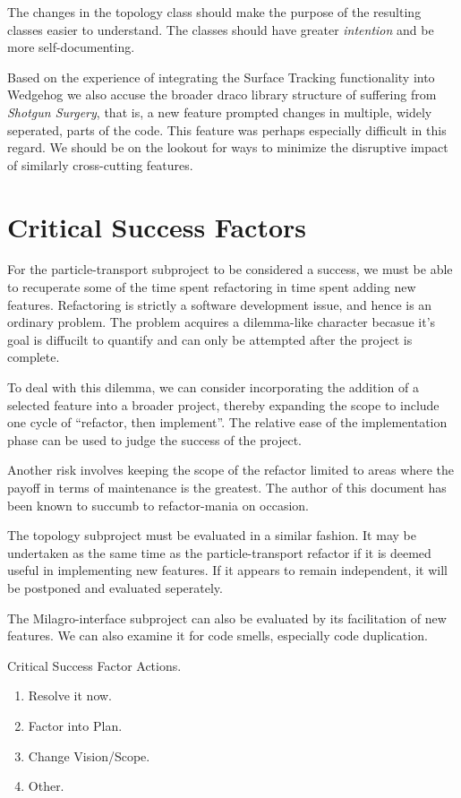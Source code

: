 \documentclass[11pt]{nmemo}
\begin{document}
The changes in the topology class should make the purpose of the
resulting classes easier to understand. The classes should have
greater {\em intention} and be more self-documenting.

Based on the experience of integrating the Surface Tracking
functionality into Wedgehog we also accuse the broader draco library
structure of suffering from {\em Shotgun Surgery}, that is, a new
feature prompted changes in multiple, widely seperated, parts of the
code. This feature was perhaps especially difficult in this regard. We
should be on the lookout for ways to minimize the disruptive impact of
similarly cross-cutting features.

\newpage
\section*{Critical Success Factors}

For the particle-transport subproject to be considered a success, we
must be able to recuperate some of the time spent refactoring in time
spent adding new features. Refactoring is strictly a software
development issue, and hence is an ordinary problem. The problem
acquires a dilemma-like character becasue it's goal is diffucilt to
quantify and can only be attempted after the project is complete.

To deal with this dilemma, we can consider incorporating the addition
of a selected feature into a broader project, thereby expanding the
scope to include one cycle of ``refactor, then implement''. The
relative ease of the implementation phase can be used to judge the
success of the project.

Another risk involves keeping the scope of the refactor limited to
areas where the payoff in terms of maintenance is the greatest. The
author of this document has been known to succumb to refactor-mania on
occasion. 

The topology subproject must be evaluated in a similar fashion. It may
be undertaken as the same time as the particle-transport refactor if
it is deemed useful in implementing new features. If it appears to
remain independent, it will be postponed and evaluated seperately.

The Milagro-interface subproject can also be evaluated by its
facilitation of new features. We can also examine it for code smells,
especially code duplication.

\begin{table}[ht]
  \caption{Critical Success Factor Actions.}
    \begin{enumerate}
    \item Resolve it now.
    \item Factor into Plan.
    \item Change Vision/Scope.
    \item Other.
    \end{enumerate}
\end{table}
\end{document}
